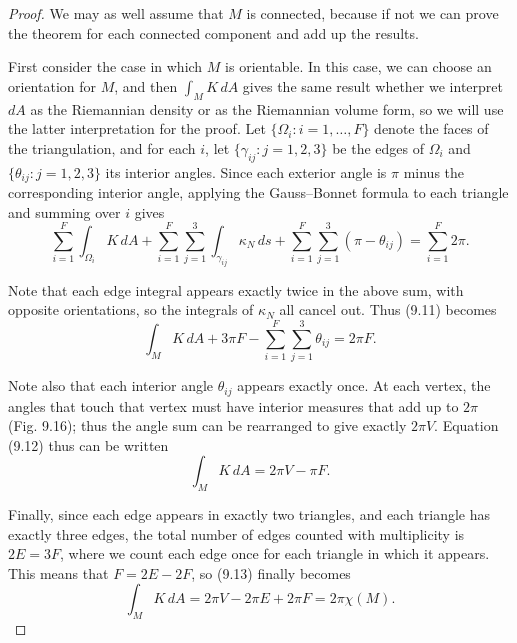 \begin{proof}
We may as well assume that $M$ is connected, because if not we can prove the theorem for each connected component and add up the results.

First consider the case in which $M$ is orientable. In this case, we can choose an orientation for $M$, and then $\int_M K \, dA$ gives the same result whether we interpret $dA$ as the Riemannian density or as the Riemannian volume form, so we will use the latter interpretation for the proof. Let $\{\Omega_i : i = 1, \ldots, F\}$ denote the faces of the triangulation, and for each $i$, let $\{\gamma_{ij} : j = 1,2,3\}$ be the edges of $\Omega_i$ and $\{\theta_{ij} : j = 1,2,3\}$ its interior angles. Since each exterior angle is $\pi$ minus the corresponding interior angle, applying the Gauss--Bonnet formula to each triangle and summing over $i$ gives
\begin{equation}
\sum_{i=1}^{F} \int_{\Omega_i} K \, dA + \sum_{i=1}^{F} \sum_{j=1}^{3} \int_{\gamma_{ij}} \kappa_N \, ds + \sum_{i=1}^{F} \sum_{j=1}^{3} (\pi - \theta_{ij}) = \sum_{i=1}^{F} 2\pi. \tag{9.11}
\end{equation}

Note that each edge integral appears exactly twice in the above sum, with opposite orientations, so the integrals of $\kappa_N$ all cancel out. Thus (9.11) becomes
\begin{equation}
\int_M K \, dA + 3\pi F - \sum_{i=1}^{F} \sum_{j=1}^{3} \theta_{ij} = 2\pi F. \tag{9.12}
\end{equation}

Note also that each interior angle $\theta_{ij}$ appears exactly once. At each vertex, the angles that touch that vertex must have interior measures that add up to $2\pi$ (Fig. 9.16); thus the angle sum can be rearranged to give exactly $2\pi V$. Equation (9.12) thus can be written
\begin{equation}
\int_M K \, dA = 2\pi V - \pi F. \tag{9.13}
\end{equation}

Finally, since each edge appears in exactly two triangles, and each triangle has exactly three edges, the total number of edges counted with multiplicity is $2E = 3F$, where we count each edge once for each triangle in which it appears. This means that $F = 2E - 2F$, so (9.13) finally becomes
\[
\int_M K \, dA = 2\pi V - 2\pi E + 2\pi F = 2\pi \chi(M).
\]



\end{proof}
